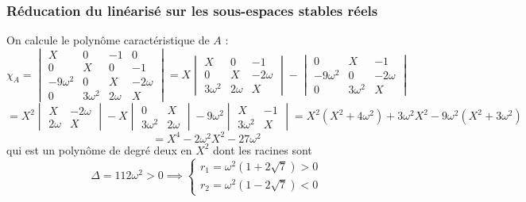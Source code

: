 \documentclass[12pt]{article}
\theoremstyle{definition}
\theoremstyle{definition}
\begin{document}
	
	\subsubsection{Réducation du linéarisé sur les sous-espaces stables réels}
	On calcule le polynôme caractéristique de $A$ :
	\begin{equation}
		\label{polynome carac de A}
		\chi_A =
		\begin{vmatrix}
			X & 0 & -1 & 0 
			\\
			0 & X & 0 & -1
			\\
			-9\omega^2 & 0 & X & - 2 \omega
			\\
			0 & 3\omega^2 & 2\omega & X
		\end{vmatrix}
		=
		X\begin{vmatrix}
			X & 0 & -1
			\\
			0 & X & - 2 \omega
			\\
			3\omega^2 & 2\omega & X
		\end{vmatrix}
		- \begin{vmatrix}
			0 & X & -1
			\\
			-9\omega^2 & 0 & - 2 \omega
			\\
			0 & 3\omega^2 & X
		\end{vmatrix}
	\end{equation}
	\begin{equation*}
		=
		X^2\begin{vmatrix}
			X & - 2 \omega
			\\
			2\omega & X
		\end{vmatrix}
		-X\begin{vmatrix}
			0 & X
			\\
			3\omega^2 & 2\omega
		\end{vmatrix}
		-9\omega^2\begin{vmatrix}
			X & -1
			\\
			3\omega^2 & X
		\end{vmatrix}
		=
		X^2(X^2+4\omega^2) + 3\omega^2X^2 - 9\omega^2(X^2+3\omega^2)
	\end{equation*}
	\begin{equation*}
		= X^4 -2\omega^2X^2 - 27\omega^2
	\end{equation*}
	qui est un polynôme de degré deux en $X^2$ dont les racines sont
	\begin{equation}
		\Delta = 112\omega^2 > 0
		\implies
		\begin{cases}
			r_1 = \omega^2(1 + 2\sqrt{7}) > 0
			\\
			r_2 = \omega^2(1 - 2\sqrt{7}) < 0
		\end{cases}
	\end{equation}
\end{document}
